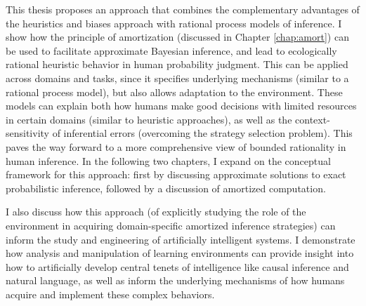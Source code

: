 This thesis proposes an approach that combines the complementary advantages of the heuristics and biases approach with rational process models of inference. I show how the principle of amortization (discussed in Chapter \ref{chap:amort}) can be used to facilitate approximate Bayesian inference, and lead to ecologically rational heuristic behavior in human probability judgment. This can be applied across domains and tasks, since it specifies underlying mechanisms (similar to a rational process model), but also allows adaptation to the environment. These models can explain both how humans make good decisions with limited resources in certain domains (similar to heuristic approaches), as well as the context-sensitivity of inferential errors (overcoming the strategy selection problem). This paves the way forward to a more comprehensive view of bounded rationality in human inference. In the following two chapters, I expand on the conceptual framework for this approach: first by discussing approximate solutions to exact probabilistic inference, followed by a discussion of amortized computation.

I also discuss how this approach (of explicitly studying the role of the environment in acquiring domain-specific amortized inference strategies) can inform the study and engineering of artificially intelligent systems. I demonstrate how analysis and manipulation of learning environments can provide insight into how to artificially develop central tenets of intelligence like causal inference and natural language, as well as inform the underlying mechanisms of how humans acquire and implement these complex behaviors.
